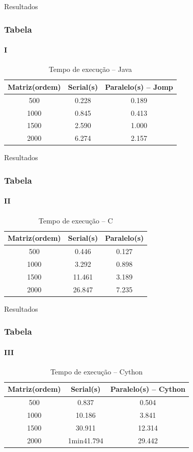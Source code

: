 \documentclass[aspectratio=169]{beamer}
\begin{document}
\begin{frame}{Resultados}
\frametitle{Tabela}
\framesubtitle{I}

\begin{table}[H]
  \centering
  \caption{Tempo de execução -- Java}
  \begin{tabular}{ccc}
    \hline
    Matriz(ordem) & Serial(s) & Paralelo(s) -- Jomp\\
    \hline
    \hline
    500 & 0.228 & 0.189\\
    1000 & 0.845 & 0.413\\
    1500 & 2.590 & 1.000\\
    2000 & 6.274 & 2.157\\
    \hline
  \end{tabular}
  \label{tab:timeJava}
\end{table}

\end{frame}

\begin{frame}{Resultados}
\frametitle{Tabela}
\framesubtitle{II}

\begin{table}[H]
  \centering
  \caption{Tempo de execução -- C}
  \begin{tabular}{ccc}
    \hline
    Matriz(ordem) & Serial(s) & Paralelo(s)\\
    \hline
    \hline
    500 & 0.446 & 0.127\\
    1000 & 3.292 & 0.898\\
    1500 & 11.461 & 3.189\\
    2000 & 26.847 & 7.235\\
    \hline
  \end{tabular}
  \label{tab:timec}
\end{table}

\end{frame}

\begin{frame}{Resultados}
\frametitle{Tabela}
\framesubtitle{III}

\begin{table}[H]
  \centering
  \caption{Tempo de execução -- Cython}
  \begin{tabular}{ccc}
    \hline
    Matriz(ordem) & Serial(s) & Paralelo(s) -- Cython \\
    \hline
    \hline
    500 & 0.837 &  0.504 \\
    1000 & 10.186 & 3.841\\
    1500 & 30.911 & 12.314\\
    2000 & 1min41.794 & 29.442\\
    \hline
  \end{tabular}
  \label{tab:timePy1}
\end{table}

\end{frame}
\end{document}
